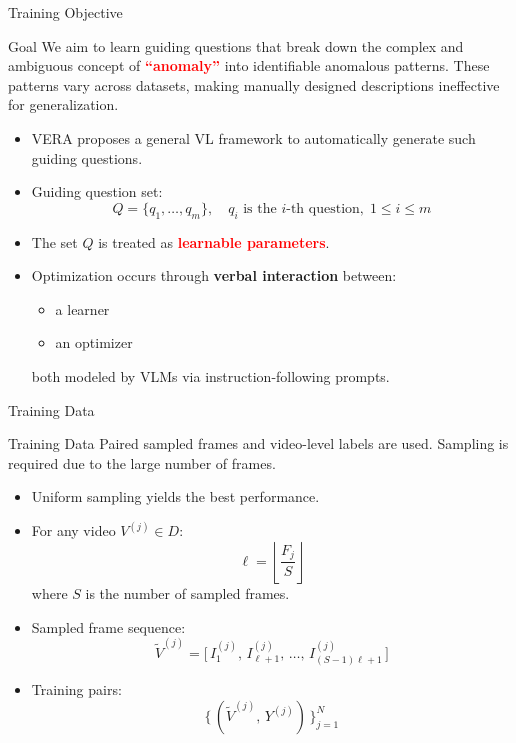 \documentclass[aspectratio=169,xcolor=dvipsnames]{beamer}
\begin{document}
	\begin{frame}{Training Objective}
		\small
		
		\begin{block}{Goal}
			We aim to learn guiding questions that break down the complex and ambiguous concept of 
			\textbf{\textcolor{red}{“anomaly”}}  
			into identifiable anomalous patterns.  
			These patterns vary across datasets, making manually designed descriptions ineffective for generalization.
		\end{block}
		
		\begin{itemize}
			\item VERA proposes a general VL framework to automatically generate such guiding questions.
			\item Guiding question set:
			\[
			Q = \{ q_1, \ldots, q_m \}, \quad q_i \text{ is the } i\text{-th question},\; 1 \le i \le m
			\]
			\item The set \(Q\) is treated as \textbf{\textcolor{red}{learnable parameters}}.
			\item Optimization occurs through \textbf{verbal interaction} between:
			\begin{itemize}
				\item a learner  
				\item an optimizer  
			\end{itemize}
			both modeled by VLMs via instruction-following prompts.
		\end{itemize}
		
	\end{frame}
	
	
	\begin{frame}{Training Data}
		
		\begin{block}{Training Data}
			Paired sampled frames and video-level labels are used. Sampling is required due to the large number of frames.
		\end{block}
		
		\begin{itemize}
			\item Uniform sampling yields the best performance.
			\item For any video \(V^{(j)} \in D\):
			\[
			\ell = \left\lfloor \frac{F_j}{S} \right\rfloor
			\]
			where \(S\) is the number of sampled frames.
			\item Sampled frame sequence:
			\[
			\tilde{V}^{(j)} = 
			\big[\, I^{(j)}_{1},\, I^{(j)}_{\ell+1},\, \ldots,\, I^{(j)}_{(S-1)\ell + 1} \,\big]
			\]
			\item Training pairs:
			\[
			\{\, (\tilde{V}^{(j)},\, Y^{(j)}) \,\}_{j=1}^{N}
			\]
		\end{itemize}
		
	\end{frame}
	
\end{document}
